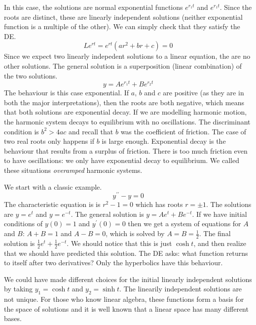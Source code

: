 \documentclass[fleqn,letterpaper]{report}
\begin{document}
In this case, the solutions are normal exponential functions
$e^{r_1 t}$ and $e^{r_1 t}$. Since the roots are distinct,
these are linearly independent solutions (neither exponential
function is a multiple of the other).  We can simply check
that they satisfy the DE. 
\begin{equation*}
L e^{rt} = e^{rt} ( ar^2 + br+ c) = 0
\end{equation*}
Since we expect two linearly indepedent solutions to a linear
equation, the are no other solutions. The general solution is
a superposition (linear combination) of the two solutions.
\begin{equation*}
y= Ae^{r_1 t} + Be^{r_2t}
\end{equation*}
The behaviour is this case exponential. If $a$, $b$ and $c$
are positive (as they are in both the major interpretations),
then the roots are both negative, which means that both
solutions are exponential decay. If we are modelling harmonic
motion, the harmonic system decays to equilibrium with no
oscillations. The discriminant condition is $b^2 > 4ac$ and
recall that $b$ was the coefficient of friction. The case of
two real roots only happens if $b$ is large enough.
Exponential decay is the behaviour that results from a surplus
of friction. There is too much friction even to have
oscillations: we only have exponential decay to equilibrium.
We called these situations \emph{overamped} harmonic systems.

\begin{example}
We start with a classic example.
\begin{equation*}
y^{\prime\prime} - y= 0 
\end{equation*} 
The characteristic equation is is $r^2 -1=0$ which has roots
$r = \pm 1$. The solutions are $y=e^t$ and $y=e^{-t}$. The
general solution is $y=Ae^t + Be^{-t}$. If we have initial
conditions of $y(0) = 1$ and $y^\prime(0) = 0$ then we get a
system of equations for $A$ and $B$: $A+B=1$ and $A-B=0$,
which is solved by $A = B = \frac{1}{2}$. The final solution
is $\frac{1}{2} e^t + \frac{1}{2} e^{-t}$. We should notice
that this is just $\cosh t$, and then realize that we should
have predicted this solution. The DE asks: what function
returns to itself after two derivatives? Only the hyperbolics
have this behaviour.

We could have made different choices for the initial linearly
independent solutions by taking $y_1 = \cosh t$ and $y_2 =
\sinh t$. The linearily independent solutions are not unique.
For those who know linear algebra, these functions form a
basis for the space of solutions and it is well known that a
linear space has many different bases.
\end{example}
\end{document}
